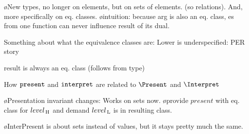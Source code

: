 \bl
\o New types, no longer on elements, but on sets of elements. (so relations). And, more specifically on eq. classes.
\o intuition: because arg is also an eq. class, es from one function can never influence result of its dual.
\el



Something about what the equivalence classes are: Lower is underspecified: 
PER story





result is always an eq. class (follows from type)


How ${\tt present}$ and ${\tt interpret}$ are related to $\Present$ and $\Interpret$




\bl
\o Presentation invariant changes: Works on sets now.
\o provide $present$ with eq. class for $level_{\, \mathrm H}$ and demand $level_{\, \mathrm L}$ is in resulting class.
\el



\bl
\o {\sc InterPresent} is about sets instead of values, but it stays pretty much the same.
\el


